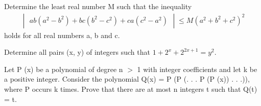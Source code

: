 
\item Determine the least real number M such that the inequality
\begin{align*}
\begin{vmatrix} ab(a^2-b^2) + bc(b^2-c^2) + ca(c^2-a^2) \end{vmatrix} \leq M(a^2 + b^2 + c^2)^2
\end{align*}
holds for all real numbers a, b and c.

\item Determine all pairs (x, y) of integers such that
$1 + 2^x + 2^{2x+1} = y^2.$

\item Let P (x) be a polynomial of degree n $>$ 1 with integer coefficients and let
k be a positive integer. Consider the polynomial Q(x) = P (P (. . . P (P (x)) . . .)), where P
occurs k times. Prove that there are at most n integers t such that Q(t) = t.
